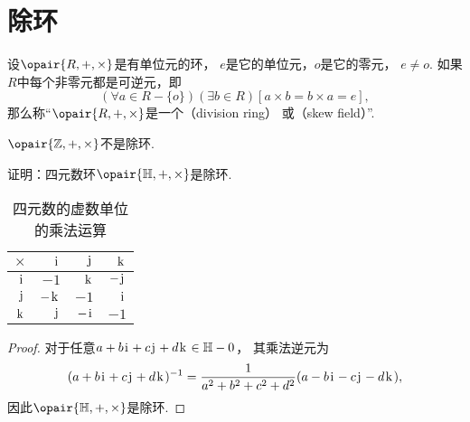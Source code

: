 \section{除环}
\begin{definition}
设\(\opair{R,+,\times}\)是有单位元的环，
\(e\)是它的单位元，\(o\)是它的零元，
\(e \neq o\).
如果\(R\)中每个非零元都是可逆元，即\begin{equation*}
	(\forall a \in R-\{o\})(\exists b \in R)[a \times b = b \times a = e],
\end{equation*}
那么称“\(\opair{R,+,\times}\)是一个（division ring）
或（skew field）”.
\end{definition}

\begin{example}
\(\opair{\mathbb{Z},+,\times}\)不是除环.
\end{example}

\begin{example}
证明：四元数环\(\opair{\mathbb{H},+,\times}\)是除环.
\begin{table}[hbt]
	\centering
	\begin{tabular}{r|*3r}
		\(\times\) & \(\iu\) & \(\ju\) & \(\ku\) \\ \hline
		\(\iu\) & \(-1\) & \(\ku\) & \(-\ju\) \\
		\(\ju\) & \(-\ku\) & \(-1\) & \(\iu\) \\
		\(\ku\) & \(\ju\) & \(-\iu\) & \(-1\) \\
	\end{tabular}
	\caption{四元数的虚数单位的乘法运算}
\end{table}
\begin{proof}
对于任意\(a+b\iu+c\ju+d\ku\in\mathbb{H}-0\)，
其乘法逆元为\begin{equation*}
	(a+b\iu+c\ju+d\ku)^{-1}
	= \frac1{a^2+b^2+c^2+d^2} (a-b\iu-c\ju-d\ku),
\end{equation*}
因此\(\opair{\mathbb{H},+,\times}\)是除环.
\end{proof}
\end{example}

